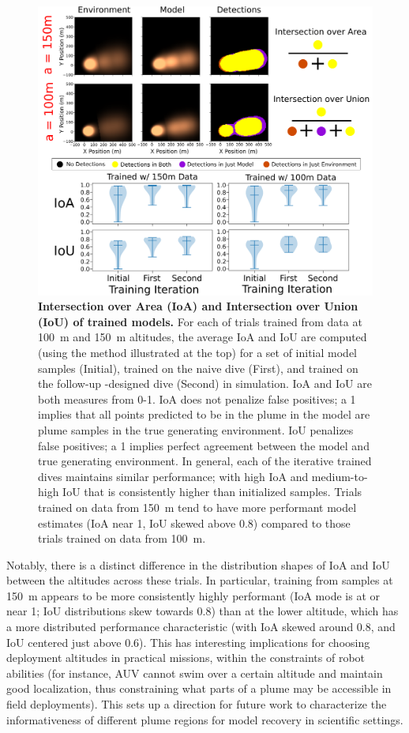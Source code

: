 \begin{figure}[h!]
    \centering
    \includegraphics[width=0.9\columnwidth]{figures/sim_mod_performance.png}
    \caption[Intersection over Area and Intersection over Union of trained models.]{\textbf{Intersection over Area (IoA) and Intersection over Union (IoU) of trained models.} For each of trials trained from data at \SI{100}{\meter} and \SI{150}{\meter} altitudes, the average IoA and IoU are computed (using the method illustrated at the top) for a set of initial model samples (Initial), \PHUMES trained on the naive dive (First), and \PHUMES trained on the follow-up \PHORTEX-designed dive (Second) in simulation. IoA and IoU are both measures from 0-1. IoA does not penalize false positives; a 1 implies that all points predicted to be in the plume in the model are plume samples in the true generating environment. IoU penalizes false positives; a 1 implies perfect agreement between the model and true generating environment. In general, each of the iterative trained dives maintains similar performance; with high IoA and medium-to-high IoU that is consistently higher than initialized samples. Trials trained on data from \SI{150}{\meter} tend to have more performant model estimates (IoA near 1, IoU skewed above 0.8) compared to those trials trained on data from \SI{100}{\meter}.}
    \label{fig:sim_phumes_perform}
\end{figure}

Notably, there is a distinct difference in the distribution shapes of IoA and IoU between the altitudes across these trials. In particular, training from samples at \SI{150}{\meter} appears to be more consistently highly performant (IoA mode is at or near 1; IoU distributions skew towards 0.8) than at the lower altitude, which has a more distributed performance characteristic (with IoA skewed around 0.8, and IoU centered just above 0.6). This has interesting implications for choosing deployment altitudes in practical missions, within the constraints of robot abilities (for instance, AUV \Sentry cannot swim over a certain altitude and maintain good localization, thus constraining what parts of a plume may be accessible in field deployments). This sets up a direction for future work to characterize the informativeness of different plume regions for model recovery in scientific settings.


